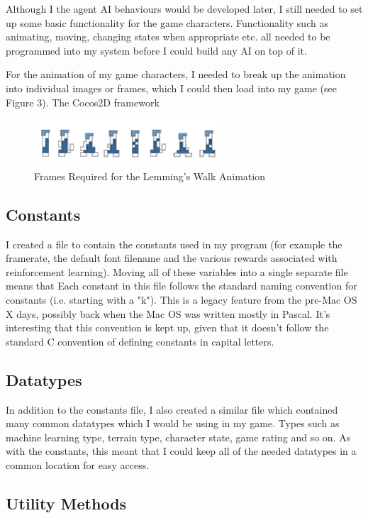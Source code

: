 \documentclass[a4paper,oneside]{report}
\begin{document}
Although I the agent AI behaviours would be developed later, I still needed to set up some basic functionality for the game characters. Functionality such as animating, moving, changing states when appropriate etc. all needed to be programmed into my system before I could build any AI on top of it.

For the animation of my game characters, I needed to break up the animation into individual images or frames, which I could then load into my game (see Figure 3). The Cocos2D framework  

\begin{figure}[h!]
  \centering
    \includegraphics[width=70mm]{sources/images/Lemming_walk_anim}
    \caption{Frames Required for the Lemming's Walk Animation}
\end{figure}

\subsection{Constants} 

I created a file to contain the constants used in my program (for example the framerate, the default font filename and the various rewards associated with reinforcement learning). Moving all of these variables into a single separate file means that Each constant in this file follows the standard naming convention for constants (i.e. starting with a "k"). This is a legacy feature from the pre-Mac OS X days, possibly back when the Mac OS was written mostly in Pascal. It's interesting that this convention is kept up, given that it doesn't follow the standard C convention of defining constants in capital letters. 

\subsection{Datatypes} 

In addition to the constants file, I also created a similar file which contained many common datatypes which I would be using in my game. Types such as machine learning type, terrain type, character state, game rating and so on. As with the constants, this meant that I could keep all of the needed datatypes in a common location for easy access.

\subsection{Utility Methods} 
\end{document}

